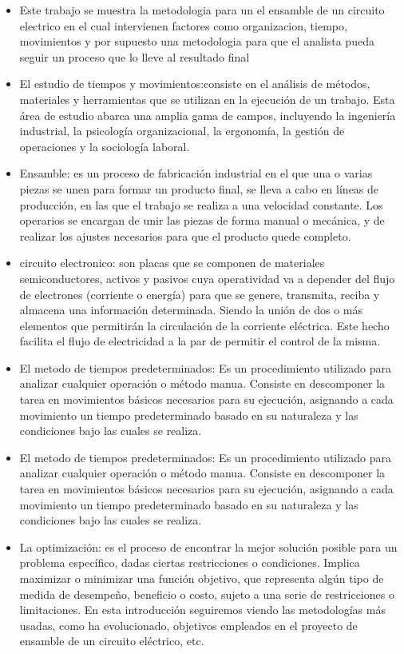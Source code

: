   \begin{itemize}
  \item Este trabajo se muestra la metodologia para un  el ensamble de un circuito electrico en el cual intervienen factores como organizacion, tiempo, movimientos y por supuesto una metodologia para que el analista pueda seguir un proceso que lo lleve al resultado final 
      \item El estudio de tiempos y movimientos:consiste  en el análisis de métodos, materiales y herramientas que se utilizan en la ejecución de un trabajo. Esta área de estudio abarca una amplia gama de campos, incluyendo la ingeniería industrial, la psicología organizacional, la ergonomía, la gestión de operaciones y la sociología laboral.
       \item  Ensamble: es un proceso de fabricación industrial en el que una o varias piezas se unen para formar un producto final, se lleva a cabo en líneas de producción, en las que el trabajo se realiza a una velocidad constante. Los operarios se encargan de unir las piezas de forma manual o mecánica, y de realizar los ajustes necesarios para que el producto quede completo.
     \item circuito electronico: son placas que se componen de materiales semiconductores, activos y pasivos cuya operatividad va a depender del flujo de electrones (corriente o energía) para que se  genere, transmita, reciba y almacena una información determinada. Siendo  la unión de dos o más elementos que permitirán la circulación de la corriente eléctrica. Este hecho facilita el flujo de electricidad a la par de permitir el control de la misma.
    \item El metodo de tiempos predeterminados: Es un procedimiento utilizado para analizar cualquier operación o método manua. Consiste en descomponer la tarea en movimientos básicos necesarios para su ejecución, asignando a cada movimiento un tiempo predeterminado basado en su naturaleza y las condiciones bajo las cuales se realiza.
   \item El metodo de tiempos predeterminados: Es un procedimiento utilizado para analizar cualquier operación o método manua. Consiste en descomponer la tarea en movimientos básicos necesarios para su ejecución, asignando a cada movimiento un tiempo predeterminado basado en su naturaleza y las condiciones bajo las cuales se realiza.
   \item La optimización: es el proceso de encontrar la mejor solución posible para un problema específico, dadas ciertas restricciones o condiciones. Implica maximizar o minimizar una función objetivo, que representa algún tipo de medida de desempeño, beneficio o costo, sujeto a una serie de restricciones o limitaciones. En esta introducción seguiremos viendo las metodologías más usadas, como ha evolucionado, objetivos empleados en el  proyecto de ensamble de un circuito eléctrico, etc.
  \end{itemize}
